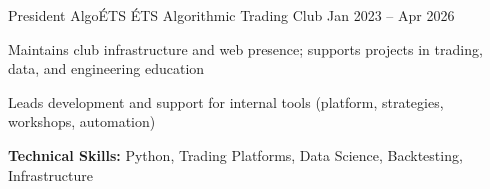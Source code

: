 
\begin{cventries}

\cventry
{President} %
{AlgoÉTS} %
{ÉTS Algorithmic Trading Club} %
{Jan 2023 -- Apr 2026} %
{
\begin{cvitems}
\item {Maintains club infrastructure and web presence; supports projects in trading, data, and engineering education}
\item {Leads development and support for internal tools (platform, strategies, workshops, automation)}
\item {\textbf{Technical Skills:} Python, Trading Platforms, Data Science, Backtesting, Infrastructure}
\end{cvitems}
}

\end{cventries}
